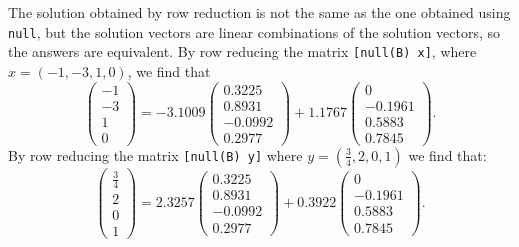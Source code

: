 \documentclass{ximera}
\begin{document}
\begin{computerExercise}
\begin{solution}
The solution obtained by row reduction is not the same as the one
obtained using {\tt null}, but the solution vectors are linear
combinations of the \Matlab solution vectors, so the answers are
equivalent.  By row reducing the matrix {\tt [null(B) x]}, where
$x = (-1,-3,1,0)$, we find that
\[
\left(\begin{array}{r} -1 \\ -3 \\ 1 \\ 0 \end{array}\right) =
-3.1009\left(\begin{array}{r} 0.3225 \\ 0.8931 \\ -0.0992 \\ 0.2977
\end{array}\right) + 1.1767\left(\begin{array}{r} 0 \\ -0.1961 \\
0.5883 \\ 0.7845 \end{array}\right).
\]
By row reducing the matrix {\tt [null(B) y]} where $y = (\frac{3}{4},
2,0,1)$ we find that:
\[
\left(\begin{array}{r} \frac{3}{4} \\ 2 \\ 0 \\ 1 \end{array}\right) =
2.3257\left(\begin{array}{r} 0.3225 \\ 0.8931 \\ -0.0992 \\ 0.2977
\end{array}\right) + 0.3922\left(\begin{array}{r} 0 \\ -0.1961 \\
0.5883 \\ 0.7845 \end{array}\right).
\]

\end{solution}
\end{computerExercise}
\end{document}
